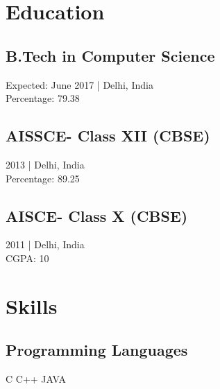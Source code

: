 \documentclass[]{deedy-resume-openfont}
\begin{document}
%
%



%
%

\begin{minipage}[t]{0.33\textwidth} 


\section{Education} 

\subsection{B.Tech in Computer Science}
Expected: June 2017 | Delhi, India \\ Percentage: 79.38
\sectionsep

\subsection{AISSCE- Class XII (CBSE)}
2013 | Delhi, India \\ Percentage: 89.25
\sectionsep

\subsection{AISCE- Class X (CBSE)}
2011 | Delhi, India \\ CGPA: 10
\sectionsep


\section{Skills}
\subsection{Programming Languages}
C \textbullet{} C++ \textbullet{} JAVA
\sectionsep

\end{minipage}
\end{document}
